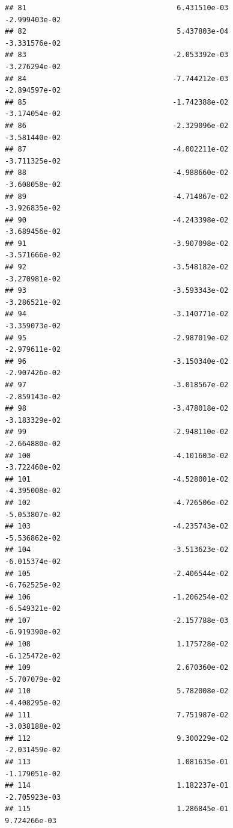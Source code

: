 \documentclass[
]{article}
\begin{document}
\begin{verbatim}
## 81                                   6.431510e-03          -2.999403e-02
## 82                                   5.437803e-04          -3.331576e-02
## 83                                  -2.053392e-03          -3.276294e-02
## 84                                  -7.744212e-03          -2.894597e-02
## 85                                  -1.742388e-02          -3.174054e-02
## 86                                  -2.329096e-02          -3.581440e-02
## 87                                  -4.002211e-02          -3.711325e-02
## 88                                  -4.988660e-02          -3.608058e-02
## 89                                  -4.714867e-02          -3.926835e-02
## 90                                  -4.243398e-02          -3.689456e-02
## 91                                  -3.907098e-02          -3.571666e-02
## 92                                  -3.548182e-02          -3.270981e-02
## 93                                  -3.593343e-02          -3.286521e-02
## 94                                  -3.140771e-02          -3.359073e-02
## 95                                  -2.987019e-02          -2.979611e-02
## 96                                  -3.150340e-02          -2.907426e-02
## 97                                  -3.018567e-02          -2.859143e-02
## 98                                  -3.478018e-02          -3.183329e-02
## 99                                  -2.948110e-02          -2.664880e-02
## 100                                 -4.101603e-02          -3.722460e-02
## 101                                 -4.528001e-02          -4.395008e-02
## 102                                 -4.726506e-02          -5.053807e-02
## 103                                 -4.235743e-02          -5.536862e-02
## 104                                 -3.513623e-02          -6.015374e-02
## 105                                 -2.406544e-02          -6.762525e-02
## 106                                 -1.206254e-02          -6.549321e-02
## 107                                 -2.157788e-03          -6.919390e-02
## 108                                  1.175728e-02          -6.125472e-02
## 109                                  2.670360e-02          -5.707079e-02
## 110                                  5.782008e-02          -4.408295e-02
## 111                                  7.751987e-02          -3.038188e-02
## 112                                  9.300229e-02          -2.031459e-02
## 113                                  1.081635e-01          -1.179051e-02
## 114                                  1.182237e-01          -2.705923e-03
## 115                                  1.286845e-01           9.724266e-03

\end{verbatim}
\end{document}
